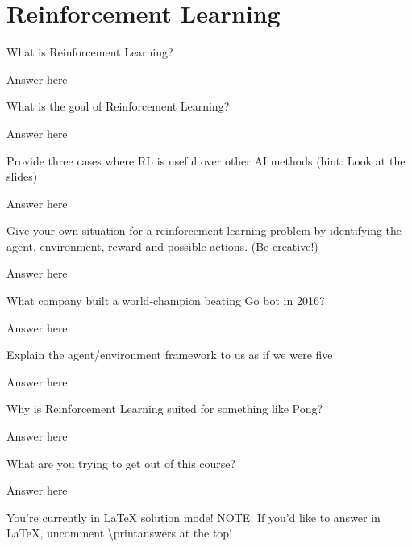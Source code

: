 \documentclass{exam}
\begin{document}
\section{Reinforcement Learning}
\begin{questions}

    \question What is Reinforcement Learning?
    \begin{solution}[.2in]
        Answer here
    \end{solution}

    \question What is the goal of Reinforcement Learning? 
    \begin{solution}[.2in]
        Answer here
    \end{solution}

    \question Provide three cases where RL is useful over other AI methods (hint: Look at the slides)
    \begin{solution}[.2in]
        Answer here
    \end{solution}

    \question Give your own situation for a reinforcement learning problem by identifying the agent, environment, reward and possible actions. (Be creative!)
    \begin{solution}[.2in]
        Answer here
    \end{solution}

    \question What company built a world-champion beating Go bot in 2016? 
    \begin{solution}[.2in]
        Answer here
    \end{solution}

    \question Explain the agent/environment framework to us as if we were five
    \begin{solution}[.2in]
        Answer here
    \end{solution}

    \question Why is Reinforcement Learning suited for something like Pong?
    \begin{solution}[.2in]
        Answer here
    \end{solution}

    \question What are you trying to get out of this course? 
    \begin{solution}[.2in]
        Answer here
    \end{solution}

\end{questions}

\ifprintanswers
You're currently in LaTeX solution mode!
\else
NOTE: If you'd like to answer in LaTeX, uncomment \textbackslash printanswers at the top!
\fi
\end{document}
